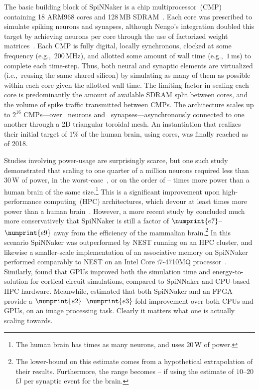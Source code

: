 The basic building block of SpiNNaker is a chip multiprocessor~(CMP) containing 18 ARM968 cores and 128\,MB SDRAM~\citep{painkras2013spinnaker, furber2013overview}.
Each core was prescribed to simulate  spiking neurons and  synapses, although Nengo's integration doubled this target by achieving  neurons per core through the use of factorized weight matrices~\citep{mundy2015}.
Each CMP is fully digital, locally synchronous, clocked at some frequency (e.g.,~$200$\,MHz), and allotted some amount of wall time (e.g.,~$1$\,ms) to complete each time-step.
Thus, both neural and synaptic elements are virtualized (i.e.,~reusing the same shared silicon) by simulating as many of them as possible within each core given the allotted wall time.
The limiting factor in scaling each core is predominantly the amount of available SDRAM split between cores, and the volume of spike traffic transmitted between CMPs.
The architecture scales up to $2^{16}$ CMPs---over ~neurons and ~synapses---asynchronously connected to one another through a 2D triangular toroidal mesh.
An instantiation that realizes their initial target of 1\% of the human brain, using  cores, was finally reached as of 2018.

Studies involving power-usage are surprisingly scarce, but one such study demonstrated that scaling to one quarter of a million neurons required less than $30$\,W of power, in the worst-case~\citep{stromatias2013power}, or on the order of -- times more power than a human brain of the same size.\footnote{
The human brain has  times as many neurons, and uses $20$\,W of power.}
This is a significant improvement upon high-performance computing~(HPC) architectures, which devour at least  times more power than a human brain~\citep{furber2012build}. 
However, a more recent study by \citet{van2018performance} concluded much more conservatively that SpiNNaker is still a factor of $\numprint{e7}$--$\numprint{e9}$ away from the efficiency of the mammalian brain.\footnote{
The lower-bound on this estimate comes from a hypothetical extrapolation of their results. Furthermore, the range becomes -- if using the estimate of $10$--$20$\,fJ per synaptic event for the brain.}
In this scenario SpiNNaker was outperformed by NEST running on an HPC cluster, and likewise a smaller-scale implementation of an associative memory on SpiNNaker performed comparably to NEST on an Intel Core i7-4710MQ processor~\citep{stockel2017binary}.
Similarly, \citet{knight2018gpus} found that GPUs improved both the simulation time and energy-to-solution for cortical circuit simulations, compared to SpiNNaker and CPU-based HPC hardware.
Meanwhile, \citet{sugiarto2016high} estimated that both SpiNNaker and an FPGA provide a $\numprint{e2}$--$\numprint{e3}$-fold improvement over both CPUs and GPUs, on an image processing task. 
Clearly it matters what one is actually scaling towards.

